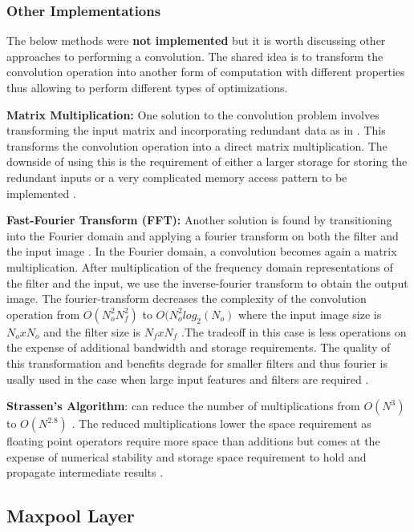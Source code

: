 \subsubsection{Other Implementations}

The below methods were \textbf{not implemented} but it is worth discussing other approaches to performing a convolution. The shared idea is to transform the convolution operation into another form of computation with different properties thus allowing to perform different types of optimizations. 

\textbf{Matrix Multiplication:} One solution to the convolution problem involves transforming the input matrix and incorporating redundant data as in \cite{cudnn}. This transforms the convolution operation into a direct matrix multiplication. The downside of using this is the requirement of either a larger storage for storing the redundant inputs or a very complicated memory access pattern to be implemented \cite{ddl}.

\textbf{Fast-Fourier Transform (FFT):} Another solution is found by transitioning into the Fourier domain and applying a fourier transform on both the filter and the input image \cite{vasilache2014fast}. In the Fourier domain, a convolution becomes again a matrix multiplication. After multiplication of the frequency domain representations of the filter and the input, we use the inverse-fourier transform to obtain the output image. The fourier-transform decreases the complexity of the convolution operation from $ O(N_o^2N_f^2) $ to $ O(N_o^2log_2(N_o) $ where the input image size is $ N_oxN_o$ and the filter size is $ N_fxN_f $ \cite{sze2017efficient}.The tradeoff in this case is less operations on the expense of additional bandwidth and storage requirements. The quality of this transformation and benefits degrade for smaller filters and thus fourier is usally used in the case when large input features and filters are required \cite{sze2017efficient}. 

\textbf{Strassen's Algorithm}\cite{cong2014minimizing}: can reduce the number of multiplications from $O(N^3)$ to $O(N^{2.8})$\cite{sze2017efficient} . The reduced multiplications lower the space requirement as floating point operators require more space than additions but comes at the expense of numerical stability and storage space requirement to hold and propagate intermediate results \cite{sze2017efficient}.

\subsection{Maxpool Layer}

